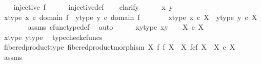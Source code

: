 \begin{isabellebody}
\ \ \isamarkupfalse%
\ {\isachardoublequoteopen}injective\ f{\isachardoublequoteclose}\isanewline
\ \ \ \ \isamarkupfalse%
\ injective{\isacharunderscore}{\kern0pt}def\isanewline
\ \ \isamarkupfalse%
\ clarify\isanewline
\ \ \ \ \isamarkupfalse%
\ x\ y\isanewline
\ \ \ \ \isamarkupfalse%
\ x{\isacharunderscore}{\kern0pt}type{\isacharcolon}{\kern0pt}\ {\isachardoublequoteopen}x\ {\isasymin}\isactrlsub c\ domain\ f{\isachardoublequoteclose}\ \ y{\isacharunderscore}{\kern0pt}type{\isacharcolon}{\kern0pt}\ {\isachardoublequoteopen}y\ {\isasymin}\isactrlsub c\ domain\ f{\isachardoublequoteclose}\isanewline
\ \ \ \ \isamarkupfalse%
\ \isamarkupfalse%
\ x{\isacharunderscore}{\kern0pt}type{}{\isacharcolon}{\kern0pt}\ {\isachardoublequoteopen}x\ {\isasymin}\isactrlsub c\ X{\isachardoublequoteclose}\ \ y{\isacharunderscore}{\kern0pt}type{}{\isacharcolon}{\kern0pt}\ {\isachardoublequoteopen}y\ {\isasymin}\isactrlsub c\ X{\isachardoublequoteclose}\isanewline
\ \ \ \ \ \ \isamarkupfalse%
\ assms{\isacharparenleft}{\kern0pt}{}{\isacharparenright}{\kern0pt}\ cfunc{\isacharunderscore}{\kern0pt}type{\isacharunderscore}{\kern0pt}def\ \isamarkupfalse%
\ auto\isanewline
\isanewline
\ \ \ \ \isamarkupfalse%
\ x{\isacharunderscore}{\kern0pt}y{\isacharunderscore}{\kern0pt}type{\isacharcolon}{\kern0pt}\ {\isachardoublequoteopen}{\isasymlangle}x{\isacharcomma}{\kern0pt}y{\isasymrangle}\ {\isacharcolon}{\kern0pt}\ {\isasymone}\ {\isasymrightarrow}\ X\ {\isasymtimes}\isactrlsub c\ X{\isachardoublequoteclose}\isanewline
\ \ \ \ \ \ \isamarkupfalse%
\ x{\isacharunderscore}{\kern0pt}type{}\ y{\isacharunderscore}{\kern0pt}type{}\ \isamarkupfalse%
\ {\isacharparenleft}{\kern0pt}typecheck{\isacharunderscore}{\kern0pt}cfuncs{\isacharparenright}{\kern0pt}\isanewline
\ \ \ \ \isamarkupfalse%
\ fibered{\isacharunderscore}{\kern0pt}product{\isacharunderscore}{\kern0pt}type{\isacharcolon}{\kern0pt}\ {\isachardoublequoteopen}fibered{\isacharunderscore}{\kern0pt}product{\isacharunderscore}{\kern0pt}morphism\ X\ f\ f\ X\ {\isacharcolon}{\kern0pt}\ X\ \isactrlbsub f\isactrlesub {\isasymtimes}\isactrlsub c\isactrlbsub f\isactrlesub \ X\ {\isasymrightarrow}\ X\ {\isasymtimes}\isactrlsub c\ X{\isachardoublequoteclose}\isanewline
\ \ \ \ \ \ \isamarkupfalse%
\ assms\ \isamarkupfalse%

\end{isabellebody}
